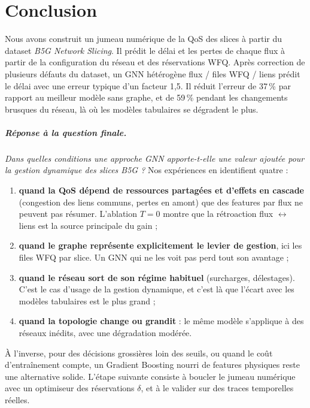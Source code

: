 \chapter{Conclusion}\label{chap:concl}
Nous avons construit un jumeau numérique de la QoS des slices à partir du dataset \emph{B5G Network Slicing}. Il prédit le délai et les pertes de chaque flux à partir de la configuration du réseau et des réservations WFQ. Après correction de plusieurs défauts du dataset, un GNN hétérogène flux / files WFQ / liens prédit le délai avec une erreur typique d'un facteur 1,5. Il réduit l'erreur de 37\,\% par rapport au meilleur modèle sans graphe, et de 59\,\% pendant les changements brusques du réseau, là où les modèles tabulaires se dégradent le plus.

\paragraph{Réponse à la question finale.} \emph{Dans quelles conditions une approche GNN apporte-t-elle une valeur ajoutée pour la gestion dynamique des slices B5G ?} Nos expériences en identifient quatre :
\begin{enumerate}
  \item \textbf{quand la QoS dépend de ressources partagées et d'effets en cascade} (congestion des liens communs, pertes en amont) que des features par flux ne peuvent pas résumer. L'ablation $T=0$ montre que la rétroaction flux $\leftrightarrow$ liens est la source principale du gain ;
  \item \textbf{quand le graphe représente explicitement le levier de gestion}, ici les files WFQ par slice. Un GNN qui ne les voit pas perd tout son avantage ;
  \item \textbf{quand le réseau sort de son régime habituel} (surcharges, délestages). C'est le cas d'usage de la gestion dynamique, et c'est là que l'écart avec les modèles tabulaires est le plus grand ;
  \item \textbf{quand la topologie change ou grandit} : le même modèle s'applique à des réseaux inédits, avec une dégradation modérée.
\end{enumerate}
À l'inverse, pour des décisions grossières loin des seuils, ou quand le coût d'entraînement compte, un Gradient Boosting nourri de features physiques reste une alternative solide. L'étape suivante consiste à boucler le jumeau numérique avec un optimiseur des réservations $\delta$, et à le valider sur des traces temporelles réelles.
